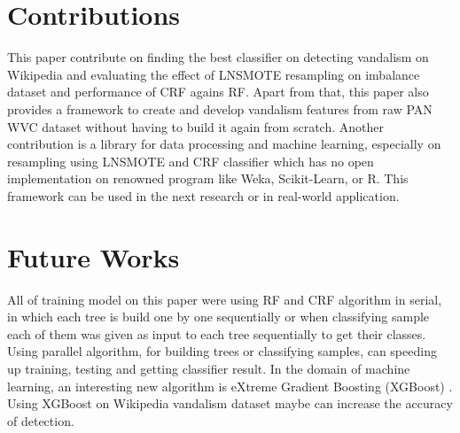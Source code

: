 \section{Contributions}

This paper contribute on finding the best classifier on detecting vandalism on
Wikipedia and evaluating the effect of LNSMOTE resampling on imbalance dataset
and performance of CRF agains RF.
Apart from that, this paper also provides a framework to create and develop
vandalism features from raw PAN WVC dataset without having to build it again
from scratch.
Another contribution is a library for data processing and machine learning,
especially on resampling using LNSMOTE and CRF classifier which has no
open implementation on renowned program like Weka, Scikit-Learn, or R.
This framework can be used in the next research or in real-world application.

\section{Future Works}

All of training model on this paper were using RF and CRF algorithm in serial,
in which each tree is build one by one sequentially or when classifying sample
each of them was given as input to each tree sequentially to get their classes.
Using parallel algorithm, for building trees or classifying samples, can
speeding up training, testing and getting classifier result.
In the domain of machine learning, an interesting new algorithm is eXtreme
Gradient Boosting (XGBoost) \cite{chen2016xgboost}.
Using XGBoost on Wikipedia vandalism dataset maybe can increase the accuracy
of detection.





